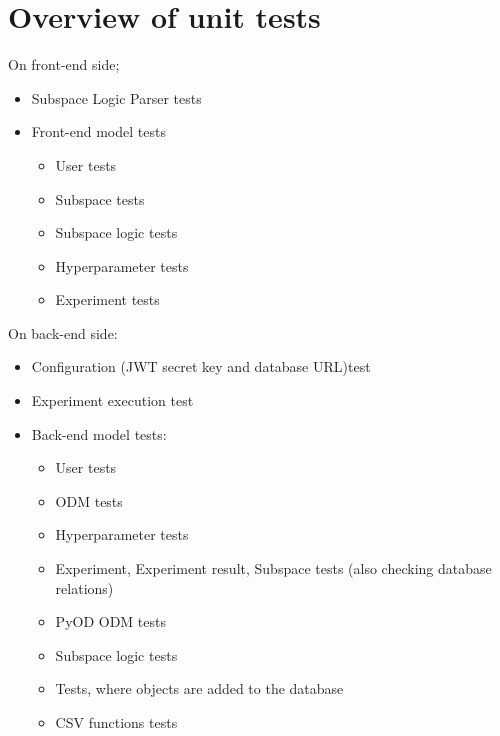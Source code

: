 \section{Overview of unit tests}
On front-end side;
\begin{itemize}
    \item Subspace Logic Parser tests
    \item Front-end model tests
    \begin{itemize}
        \item User tests
        \item Subspace tests
        \item Subspace logic tests
        \item Hyperparameter tests
        \item Experiment tests
    \end{itemize}
\end{itemize}

On back-end side:
\begin{itemize}
    \item Configuration (JWT secret key and database URL)test
    \item Experiment execution test
    \item Back-end model tests:
    \begin{itemize}
        \item User tests
        \item ODM tests
        \item Hyperparameter tests
        \item Experiment, Experiment result, Subspace tests (also checking database relations)
        \item PyOD ODM tests
        \item Subspace logic tests
        \item Tests, where objects are added to the database
        \item CSV functions tests
    \end{itemize}
\end{itemize}
\newpage
